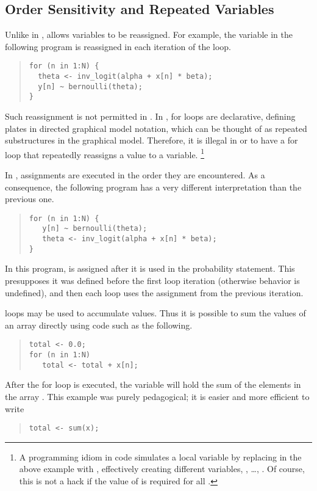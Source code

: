 \subsection{Order Sensitivity and Repeated Variables}

Unlike in \BUGS, \Stan allows variables to be reassigned.  For
example, the variable  in the following program is
reassigned in each iteration of the loop.
%
\begin{quote}
\begin{Verbatim} 
for (n in 1:N) {
  theta <- inv_logit(alpha + x[n] * beta);
  y[n] ~ bernoulli(theta);
}
\end{Verbatim}
\end{quote}
% 
Such reassignment is not permitted in \BUGS.  In \BUGS, for loops are
declarative, defining plates in directed graphical model notation,
which can be thought of as repeated substructures in the graphical
model.  Therefore, it is illegal in \BUGS or \JAGS to have a for loop
that repeatedly reassigns a value to a variable.%
%
\footnote{A programming idiom in \BUGS code simulates 
a local variable by replacing  in the above example with
, effectively creating  different variables,
, \ldots, .  Of course, this is not a
hack if the value of  is required for all .}

In \Stan, assignments are executed in the order they are encountered.
As a consequence, the following \Stan program has a very different
interpretation than the previous one.
%
\begin{quote}
\begin{Verbatim}[fontsize=\small]
for (n in 1:N) {
   y[n] ~ bernoulli(theta);
   theta <- inv_logit(alpha + x[n] * beta);
}
\end{Verbatim}
\end{quote}
%
In this program,  is assigned after it is used in the
probability statement.  This presupposes it was defined before the
first loop iteration (otherwise behavior is undefined), and then each
loop uses the assignment from the previous iteration. 

\Stan loops may be used to accumulate values.  Thus it is possible to
sum the values of an array directly using code such as the
following.
%
\begin{quote}
\begin{Verbatim}[fontsize=\small]
total <- 0.0;
for (n in 1:N) 
   total <- total + x[n];
\end{Verbatim}
\end{quote}
%
After the for loop is executed, the variable  will hold
the sum of the elements in the array .  This example was
purely pedagogical; it is easier and more efficient to write
%
\begin{quote}
\begin{Verbatim}[fontsize=\small]
total <- sum(x);
\end{Verbatim}
\end{quote}

